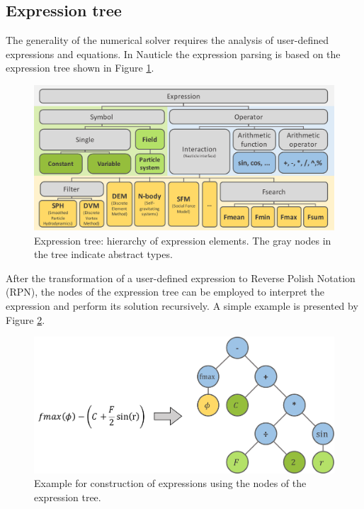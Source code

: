 \documentclass[a4paper,12pt,openany]{book}
\theoremstyle{break}
\begin{document}
\subsection{Expression tree}
The generality of the numerical solver requires the analysis of user-defined expressions and equations. In Nauticle the expression parsing is based on the expression tree shown in Figure \ref{fig:expression_tree}.
\begin{figure}[H]
  \includegraphics[scale=0.5]{expression_tree.pdf}
  \centering
  \caption{Expression tree: hierarchy of expression elements. The gray nodes in the tree indicate abstract types.}
  \label{fig:expression_tree}
\end{figure}\vspace*{3pt}

After the transformation of a user-defined expression to Reverse Polish Notation (RPN), the nodes of the expression tree can be employed to interpret the expression and perform its solution recursively. A simple example is presented by Figure \ref{fig:expression_example}.
\begin{figure}[H]
  \includegraphics[scale=0.5]{expression_example.pdf}
  \centering
  \caption{Example for construction of expressions using the nodes of the expression tree.}
  \label{fig:expression_example}
\end{figure}\vspace*{3pt}
\end{document}
